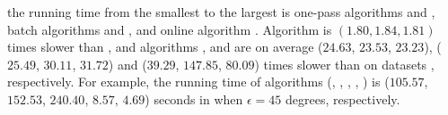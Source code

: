  the running time from the smallest to the
largest is one-pass algorithms \intersec and \interval, batch algorithms \tpa and \dpa, and online algorithm \opwa.
%
%
Algorithm \interval is $(1.80, 1.84, 1.81)$ times slower than \intersec, and algorithms \tpa, \dpa and \opwa are on average
($24.63$, $23.53$, $23.23$), ($25.49$, $30.11$, $31.72$) and ($39.29$, $147.85$, $80.09$)
times slower than \intersec on datasets \dSets, respectively.
%
For example, the running time of algorithms
(\tpa, \dpa, \opwa, \interval, \intersec) is ($105.57$, $152.53$, $240.40$, $8.57$, $4.69$) seconds in \mopsi when
$\epsilon=45$ degrees, respectively.


